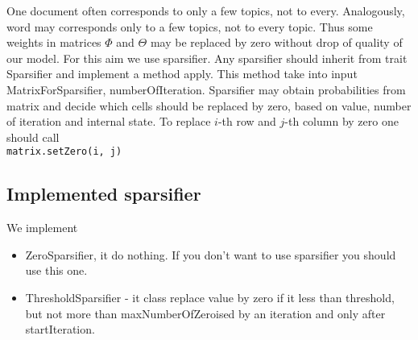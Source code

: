One document often corresponds to only a few topics, not to every. Analogously,
word may corresponds only to a few topics, not to every topic. Thus some weights in
matrices $\Phi$ and $\Theta$ may be replaced by zero without drop of quality of our model. For this aim we use
sparsifier. Any sparsifier should inherit from trait Sparsifier and implement a method apply. This method take into input
MatrixForSparsifier, numberOfIteration. Sparsifier may obtain probabilities from matrix and decide which cells should be replaced
by zero, based on value, number of iteration and internal state. To replace $i$\--th row and $j$\--th column by zero one should call\\
\texttt{matrix.setZero(i, j)}\\

\subsection{Implemented sparsifier}
    We implement
    \begin{itemize}
	\item ZeroSparsifier, it do nothing. If you don't want to use sparsifier you should use this one. 
	\item ThresholdSparsifier \-- it class replace value by zero if it less than threshold, but not more than maxNumberOfZeroised by an iteration
	    and only after startIteration.
    \end{itemize}

